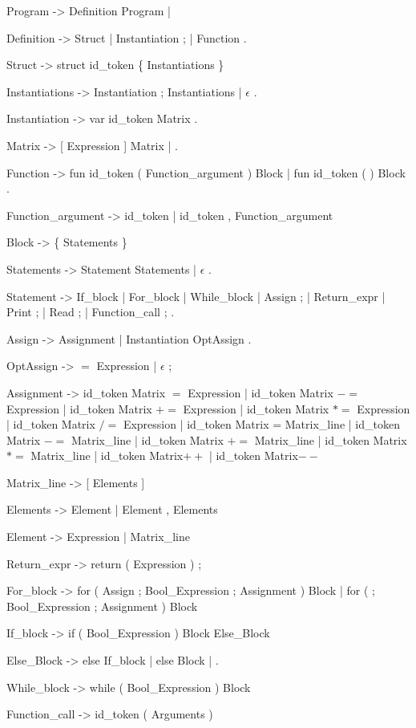 Program -> Definition Program | \epsilon

Definition -> Struct | Instantiation ; | Function .

Struct -> struct  id_token \{ Instantiations \}

Instantiations -> Instantiation ; Instantiations | $\epsilon$ .

Instantiation -> var id_token Matrix .


Matrix -> [ Expression ] Matrix | .

Function -> fun id_token ( Function_argument ) Block  | fun id_token (  ) Block .

Function_argument -> id_token | id_token , Function_argument

Block -> \{ Statements \}

Statements -> Statement Statements | $\epsilon$ .

Statement -> If_block | For_block | While_block | Assign ; | Return_expr | Print ; | Read ; | Function_call ; .

Assign -> Assignment | Instantiation OptAssign .

OptAssign -> $=$ Expression | $\epsilon$ ;

Assignment -> id_token Matrix $=$ Expression | id_token Matrix $-=$ Expression | id_token Matrix $+=$ Expression | id_token Matrix $*=$ Expression | id_token Matrix $/=$ Expression | id_token Matrix = Matrix_line | id_token Matrix $-=$ Matrix_line | id_token Matrix $+=$ Matrix_line | id_token Matrix $*=$ Matrix_line  | id_token Matrix$++$ | id_token Matrix$--$

Matrix_line -> [ Elements ]

Elements -> Element | Element , Elements

Element -> Expression | Matrix_line

Return_expr -> return ( Expression ) ;

For_block -> for ( Assign ; Bool_Expression ; Assignment ) Block | for ( ; Bool_Expression ; Assignment ) Block 

If_block -> if ( Bool_Expression ) Block Else_Block

Else_Block -> else If_block | else Block |  \epsilon .

While_block -> while ( Bool_Expression ) Block

Function_call -> id_token ( Arguments )

